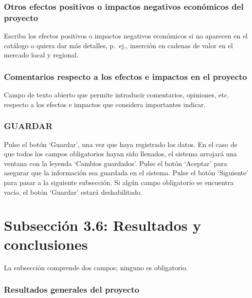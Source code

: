 \documentclass[
]{book}
\begin{document}
\hypertarget{otros-efectos-positivos-o-impactos-negativos-econuxf3micos-del-proyecto}{%
\subsection{Otros efectos positivos o impactos negativos económicos del proyecto}\label{otros-efectos-positivos-o-impactos-negativos-econuxf3micos-del-proyecto}}

Escriba los efectos positivos o impactos negativos económicos si no aparecen en el catálogo o quiera dar más detalles, p.~ej., inserción en cadenas de valor en el mercado local y regional.

\hypertarget{comentarios-respecto-a-los-efectos-e-impactos-en-el-proyecto}{%
\subsection{Comentarios respecto a los efectos e impactos en el proyecto}\label{comentarios-respecto-a-los-efectos-e-impactos-en-el-proyecto}}

Campo de texto abierto que permite introducir comentarios, opiniones, etc. respecto a los efectos e impactos que considera importantes indicar.

\hypertarget{guardar-7}{%
\subsection{GUARDAR}\label{guardar-7}}

Pulse el botón `Guardar', una vez que haya registrado los datos.
En el caso de que todos los campos obligatorios hayan sido llenados, el sistema arrojará una ventana con la leyenda `Cambios guardados'. Pulse el botón `Aceptar' para asegurar que la información sea guardada en el sistema.
Pulse el botón `Siguiente' para pasar a la siguiente subsección.
Si algún campo obligatorio se encuentra vacío, el botón `Guardar' estará deshabilitado.

\hypertarget{subsecciuxf3n-3.6-resultados-y-conclusiones}{%
\chapter*{Subsección 3.6: Resultados y conclusiones}\label{subsecciuxf3n-3.6-resultados-y-conclusiones}}

La subsección comprende dos campos; ninguno es obligatorio.

\hypertarget{resultados-generales-del-proyecto}{%
\subsection{Resultados generales del proyecto}\label{resultados-generales-del-proyecto}}
\end{document}
